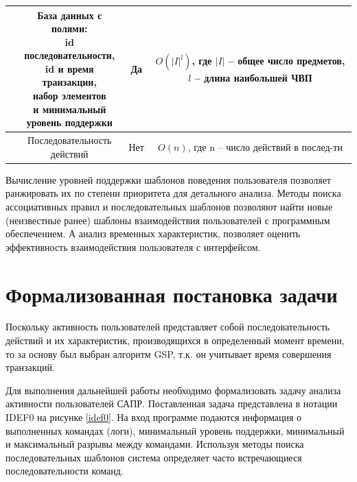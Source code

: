 \begin{table}[H]
\begin{center}
\begin{tabular}{ | c | c | c | c | }
			\specialcell{GSP} & \specialcell{База данных с полями:\\id последовательности,\\id и время транзакции,\\набор элементов\\и минимальный\\уровень поддержки} & Да & \specialcell{$O(|I|^l)$, где $|I|$ --\\общее число\\предметов,\\$l$ -- длина\\наибольшей ЧВП} \\ \hline
			
			\specialcell{GOMS} & \specialcell{Последовательность\\действий} & Нет & \specialcell{$O(n)$, где n --\\число действий\\в послед-ти} \\ \hline
		\end{tabular}
	\end{center}
\end{table}

Вычисление уровней поддержки шаблонов поведения пользователя позволяет ранжировать их по степени приоритета для детального анализа.
Методы поиска ассоциативных правил и последовательных шаблонов позволяют найти новые (неизвестные ранее) шаблоны взаимодействия пользователей с программным обеспечением.
А анализ временных характеристик, позволяет оценить эффективность взаимодействия пользователя с интерфейсом.

\section{Формализованная постановка задачи}
Поскольку
активность пользователей представляет собой последовательность действий и их характеристик, производящихся в определенный момент времени, то за основу был выбран алгоритм GSP, т.к. он учитывает время совершения транзакций.

Для выполнения дальнейшей работы необходимо формализовать задачу анализа активности пользователей САПР. Поставленная задача представлена в нотации IDEF0 на рисунке \ref{idef0}. На вход программе подаются информация о выполненных командах (логи), минимальный уровень поддержки, минимальный и максимальный разрывы между командами. Используя методы поиска последовательных шаблонов система определяет часто встречающиеся последовательности команд.

